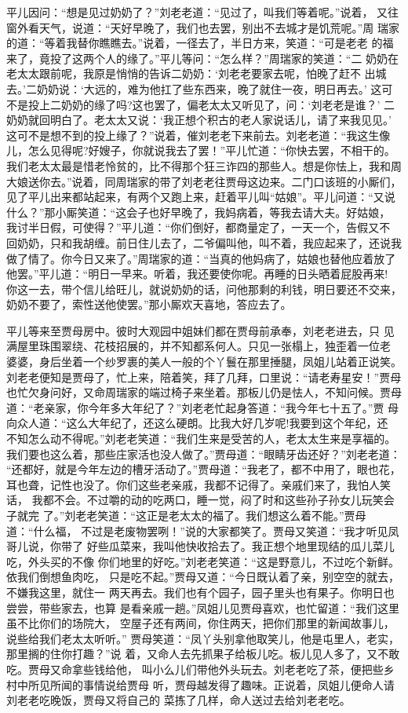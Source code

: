 平儿因问：“想是见过奶奶了？”刘老老道：“见过了，叫我们等着呢。”说着，
又往窗外看天气，说道：“天好早晚了，我们也去罢，别出不去城才是饥荒呢。”周
瑞家的道：“等着我替你瞧瞧去。”说着，一径去了，半日方来，笑道：“可是老老
的福来了，竟投了这两个人的缘了。”平儿等问：“怎么样？”周瑞家的笑道：“二
奶奶在老太太跟前呢，我原是悄悄的告诉二奶奶：‘刘老老要家去呢，怕晚了赶不
出城去。’二奶奶说：‘大远的，难为他扛了些东西来，晚了就住一夜，明日再去。’
这可不是投上二奶奶的缘了吗?这也罢了，偏老太太又听见了，问：‘刘老老是谁？’
二奶奶就回明白了。老太太又说：‘我正想个积古的老人家说话儿，请了来我见见。’
这可不是想不到的投上缘了？”说着，催刘老老下来前去。刘老老道：“我这生像
儿，怎么见得呢?好嫂子，你就说我去了罢！”平儿忙道：“你快去罢，不相干的。
我们老太太最是惜老怜贫的，比不得那个狂三诈四的那些人。想是你怯上，我和周
大娘送你去。”说着，同周瑞家的带了刘老老往贾母这边来。二门口该班的小厮们，
见了平儿出来都站起来，有两个又跑上来，赶着平儿叫“姑娘”。平儿问道：“又说
什么？”那小厮笑道：“这会子也好早晚了，我妈病着，等我去请大夫。好姑娘，
我讨半日假，可使得？”平儿道：“你们倒好，都商量定了，一天一个，告假又不
回奶奶，只和我胡缠。前日住儿去了，二爷偏叫他，叫不着，我应起来了，还说我
做了情了。你今日又来了。”周瑞家的道：“当真的他妈病了，姑娘也替他应着放了
他罢。”平儿道：“明日一早来。听着，我还要使你呢。再睡的日头晒着屁股再来!
你这一去，带个信儿给旺儿，就说奶奶的话，问他那剩的利钱，明日要还不交来，
奶奶不要了，索性送他使罢。”那小厮欢天喜地，答应去了。

平儿等来至贾母房中。彼时大观园中姐妹们都在贾母前承奉，刘老老进去，只
见满屋里珠围翠绕、花枝招展的，并不知都系何人。只见一张榻上，独歪着一位老
婆婆，身后坐着一个纱罗裹的美人一般的个丫鬟在那里捶腿，凤姐儿站着正说笑。
刘老老便知是贾母了，忙上来，陪着笑，拜了几拜，口里说：“请老寿星安！”贾母
也忙欠身问好，又命周瑞家的端过椅子来坐着。那板儿仍是怯人，不知问候。贾母
道：“老亲家，你今年多大年纪了？”刘老老忙起身答道：“我今年七十五了。”贾
母向众人道：“这么大年纪了，还这么硬朗。比我大好几岁呢!我要到这个年纪，还
不知怎么动不得呢。”刘老老笑道：“我们生来是受苦的人，老太太生来是享福的。
我们要也这么着，那些庄家活也没人做了。”贾母道：“眼睛牙齿还好？”刘老老道：
“还都好，就是今年左边的槽牙活动了。”贾母道：“我老了，都不中用了，眼也花，
耳也聋，记性也没了。你们这些老亲戚，我都不记得了。亲戚们来了，我怕人笑话，
我都不会。不过嚼的动的吃两口，睡一觉，闷了时和这些孙子孙女儿玩笑会子就完
了。”刘老老笑道：“这正是老太太的福了。我们想这么着不能。”贾母道：“什么福，
不过是老废物罢咧！”说的大家都笑了。贾母又笑道：“我才听见凤哥儿说，你带了
好些瓜菜来，我叫他快收拾去了。我正想个地里现结的瓜儿菜儿吃，外头买的不像
你们地里的好吃。”刘老老笑道：“这是野意儿，不过吃个新鲜。依我们倒想鱼肉吃，
只是吃不起。”贾母又道：“今日既认着了亲，别空空的就去，不嫌我这里，就住一
两天再去。我们也有个园子，园子里头也有果子。你明日也尝尝，带些家去，也算
是看亲戚一趟。”凤姐儿见贾母喜欢，也忙留道：“我们这里虽不比你们的场院大，
空屋子还有两间，你住两天，把你们那里的新闻故事儿，说些给我们老太太听听。”
贾母笑道：“凤丫头别拿他取笑儿，他是屯里人，老实，那里搁的住你打趣？”说
着，又命人去先抓果子给板儿吃。板儿见人多了，又不敢吃。贾母又命拿些钱给他，
叫小么儿们带他外头玩去。刘老老吃了茶，便把些乡村中所见所闻的事情说给贾母
听，贾母越发得了趣味。正说着，凤姐儿便命人请刘老老吃晚饭，贾母又将自己的
菜拣了几样，命人送过去给刘老老吃。

